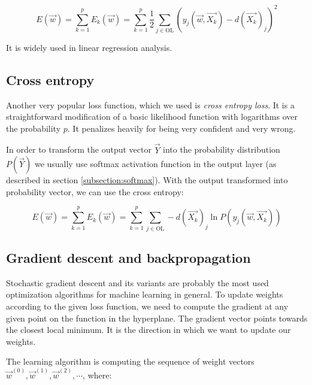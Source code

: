 $$ E(\overrightarrow{w}) = \sum_{k=1}^{p} E_k(\overrightarrow{w}) = \sum_{k=1}^{p} \frac{1}{2} \sum_{j \in \text{OL}} (y_j(\overrightarrow{w}, \overrightarrow{X_k}) - d(\overrightarrow{X_k})_j)^2 $$

\noindent
It is widely used in linear regression analysis.

\subsection*{Cross entropy}

Another very popular loss function, which we used is \textit{cross entropy loss}\cite{cross_entropy}. It is a straightforward modification of a basic likelihood function with logarithms over the probability $p$. It penalizes heavily for being very confident and very wrong. 

In order to transform the output vector $\overrightarrow{Y}$ into the probability distribution $P(\overrightarrow{Y})$ we usually use softmax activation function in the output layer (as described in section \ref{subsection:softmax}). With the output transformed into probability vector, we can use the cross entropy:

$$ E(\overrightarrow{w}) =  \sum_{k=1}^{p} E_k(\overrightarrow{w}) = \sum_{k=1}^{p} \sum_{j \in \text{OL}} - d(\overrightarrow{X_k})_j \ln{P(y_j(\overrightarrow{w}, \overrightarrow{X_k}))}$$

\subsection{Gradient descent and backpropagation}

Stochastic gradient descent\cite{deep_learning_SGD} and its variants are probably the most used optimization algorithms for machine learning in general. To update weights according to the given loss function, we need to compute the gradient at any given point on the function in the hyperplane. The gradient vector points towards the closest local minimum. It is the direction in which we want to update our weights.

The learning algorithm is computing the sequence of weight vectors $\overrightarrow{w}^{(0)}, \overrightarrow{w}^{(1)}, \overrightarrow{w}^{(2)}, \cdots$, where:


